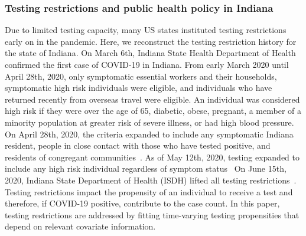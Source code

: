 \documentclass[11pt]{amsart}
\numberwithin{equation}{section}
\theoremstyle{plain}
\begin{document}

 \subsubsection{Testing restrictions and public health policy in Indiana}
 \label{section:publicpolicyindiana}

 Due to limited testing capacity, many US states instituted testing restrictions early on in the pandemic.
 Here, we reconstruct the testing restriction history for the state of Indiana.
 On March 6th, Indiana State Health Department of Health confirmed the first case of COVID-19 in Indiana.  From early March 2020 until April 28th, 2020, only symptomatic essential workers and their households, symptomatic high risk individuals were eligible, and individuals who have returned recently from overseas travel were eligible.  An individual was considered high risk if they were over the age of 65, diabetic, obese, pregnant, a member of a minority population at greater risk of severe illness, or had high blood pressure.
 On April 28th, 2020, the criteria expanded to include any symptomatic Indiana resident, people in close contact with those who have tested positive, and residents of congregant communities~\citep{wishtv2020}.
 As of May 12th, 2020, testing expanded to include any high risk individual regardless of symptom status~\citep{indystar2020}
 On June 15th, 2020, Indiana State Department of Health (ISDH) lifted all testing restrictions~\citep{indystar2020v2}.
 Testing restrictions impact the propensity of an individual to receive a test and therefore, if COVID-19 positive, contribute to the case count.  In this paper, testing restrictions are addressed by fitting time-varying testing propensities that depend on relevant covariate information.
\end{document}
